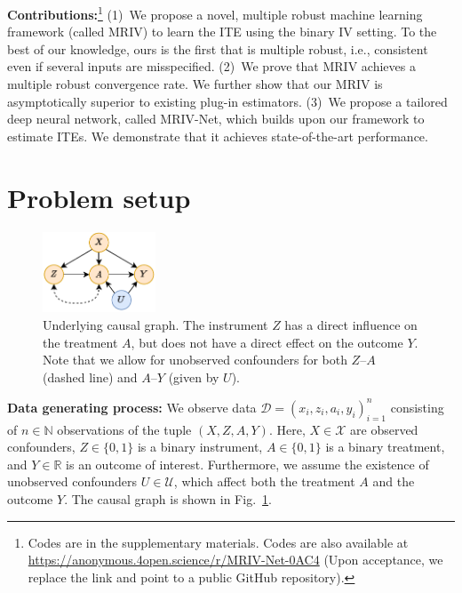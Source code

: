 \documentclass[nonatbib]{article}
\newcommand{\R}{\mathbb{R}}
\newcommand{\N}{\mathbb{N}}
\newcommand{\frameworkname}{MRIV\xspace}
\newcommand{\modelname}{\mbox{MRIV-Net}\xspace}
\theoremstyle{definition}
\theoremstyle{plain}
\begin{document}
\textbf{Contributions:}\footnote{Codes are in the supplementary materials. Codes are also available at \href{https://anonymous.4open.science/r/MRIV-Net-0AC4}{https://anonymous.4open.science/r/MRIV-Net-0AC4} (Upon acceptance, we replace the link and point to a public GitHub repository).} (1)~We propose a novel, multiple robust machine learning framework (called \frameworkname) to learn the ITE using the binary IV setting. To the best of our knowledge, ours is the first that is multiple robust, i.e., consistent even if several inputs are misspecified. (2)~We prove that \frameworkname achieves a multiple robust convergence rate. We further show that our \frameworkname is asymptotically superior to existing plug-in estimators. (3)~We propose a tailored deep neural network, called \modelname, which builds upon our framework to estimate ITEs. We demonstrate that it achieves state-of-the-art performance.


\section{Problem setup}

\begin{figure}
\vspace{-2cm}
\begin{center}
\includegraphics[width=0.3\textwidth]{img/causal_graph.pdf}
\end{center}
\caption{Underlying causal graph. The instrument $Z$ has a direct influence on the treatment $A$, but does not have a direct effect on the outcome $Y$. Note that we allow for unobserved confounders for both $Z$--$A$ (dashed line) and $A$--$Y$ (given by $U$).}
\label{fig:causal_graph}
\vspace{-0.5cm}
\end{figure}

\textbf{Data generating process:}
We observe data $\mathcal{D} = (x_i, z_i, a_i, y_i)_{i=1}^n$ consisting of $n \in \N$ observations of the tuple $(X, Z, A, Y)$.
Here, $X \in \mathcal{X}$ are observed confounders, $Z \in \{0, 1\}$ is a binary instrument, $A \in \{0, 1\}$ is a binary treatment, and $Y \in \R$ is an outcome of interest. Furthermore, we assume the existence of unobserved confounders $U \in \mathcal{U}$, which affect both the treatment $A$ and the outcome $Y$. The causal graph is shown in Fig.~\ref{fig:causal_graph}.
\end{document}
